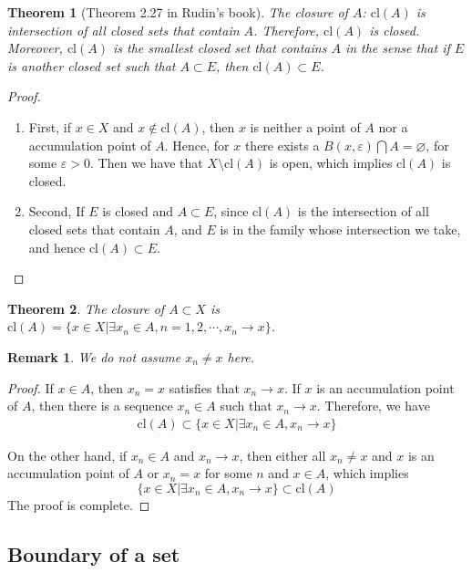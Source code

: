 \documentclass[12pt,leqno]{amsart}
\newtheorem{theorem}{Theorem}[section]
\newtheorem{remark}{Remark}[section]
\theoremstyle{definition}
\numberwithin{equation}{subsection}
\begin{document}
\begin{theorem}[Theorem 2.27 in Rudin's book]
The closure of $A$: $\text{cl}(A)$ is intersection of all closed sets that contain $A$. Therefore, $\text{cl}(A)$ is closed. Moreover, $\text{cl}(A)$ is the smallest closed set that contains $A$ in the sense that if $E$ is another closed set such that $A\subset E$, then $\text{cl}(A)\subset E$.
\end{theorem}
\begin{proof}
~\begin{enumerate}
    \item First, if $x\in X$ and $x\notin \text{cl}(A)$, then $x$ is neither a point of $A$ nor a accumulation point of $A$. Hence, for $x$ there exists a $B(x,\varepsilon) \bigcap A = \varnothing$, for some $\varepsilon > 0$. Then we have that $X\setminus \text{cl}(A)$ is open, which implies $\text{cl}(A)$ is closed.
    \item Second, If $E$ is closed and $A\subset E$, since $\text{cl}(A)$ is the intersection of all closed sets that contain $A$, and $E$ is in the family whose intersection we take, and hence $\text{cl}(A)\subset E$.
\end{enumerate}
\end{proof}

\medskip

\begin{theorem}
The closure of $A\subset X$ is $\text{cl}(A) = \{x\in X|\exists x_n\in A, n = 1,2,\cdots, x_n\to x\}$.
\end{theorem}
\begin{remark}
We do not assume $x_n \neq x$ here.
\end{remark}
\begin{proof}
If $x\in A$, then $x_n = x$ satisfies that $x_n\to x$. If $x$ is an accumulation point of $A$, then there is a sequence $x_n\in A$ such that $x_n\to x$. Therefore, we have 
\begin{align*}
    \text{cl}(A) \subset \{x\in X|\exists x_n\in A,  x_n\to x\}
\end{align*}

On the other hand, if $x_n\in A$ and $x_n\to x$, then either all $x_n \neq x$ and $x$ is an accumulation point of $A$ or $x_n  = x$ for some $n$ and $x\in A$, which implies $$\{x\in X|\exists x_n\in A,  x_n\to x\}\subset \text{cl}(A)$$
The proof is complete.
\end{proof}

\medskip

\subsection{Boundary of a set}
\end{document}
